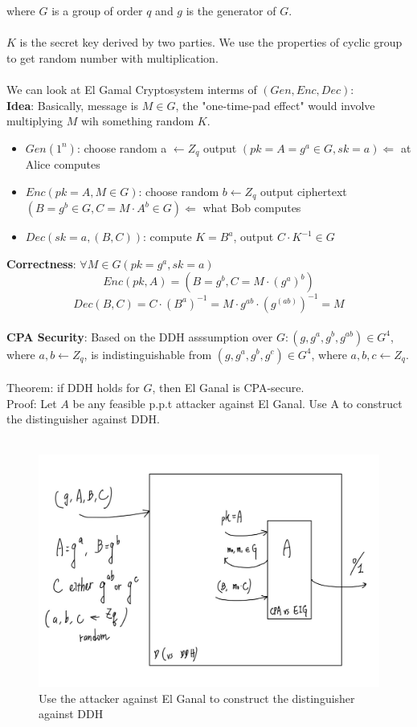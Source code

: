 \documentclass{scribe}
\begin{document}
where $G$ is a group of order $q$ and $g$ is the generator of $G$.
\\\\
$K$  is the secret key derived by two parties. We use the properties of cyclic group to get random number with multiplication.
\\\\
We can look at El Gamal Cryptosystem interms of $(Gen, Enc, Dec):$
\\
\textbf{Idea}: Basically, message is $M \in G$, the "one-time-pad effect" would involve multiplying $M$ wih something random $K$. 
\begin{itemize} 
    \item $Gen(1^n)$: choose random a $\leftarrow Z_q $ output $(pk=A=g^a \in G, sk=a) \Leftarrow$ at Alice computes\\
    \item $Enc(pk=A,M \in G)$: choose random $b \leftarrow Z_q$ output ciphertext $(B = g^b \in G, C = M \cdot A^b \in G) \Leftarrow $ what Bob computes
    \item $Dec(sk=a,(B,C))$: compute $K=B^a$, output $C \cdot K^{-1} \in G$
\end{itemize}
\textbf{Correctness}: $\forall M \in G$\text{, }$(pk=g^a,sk=a)$
\[Enc(pk,A) = (B = g^b, C = M \cdot (g^a)^b)\]
\[Dec(B,C) = C \cdot (B^a)^{-1} = M \cdot g^{ab} \cdot (g^{(ab)})^{-1} = M\]
\vspace{5mm}
\\
\noindent\textbf{CPA Security}: Based on the DDH asssumption over $G: (g,g^a,g^b,g^{ab}) \in G^4$, where $a,b \leftarrow Z_q$, is indistinguishable from $(g,g^a,g^b,g^{c}) \in G^4$, where $a,b,c \leftarrow Z_q$.
\\\\
Theorem: if DDH holds for $G$, then El Ganal is CPA-secure.
\\
Proof: Let $A$ be any feasible p.p.t attacker against El Ganal. Use A to construct the distinguisher against DDH.
\\\\
\begin{figure}[H]
    \centering
    \includegraphics[scale=0.2]{elg.jpg}
    \caption{Use the attacker against El Ganal to construct the distinguisher against DDH}
\end{figure}
\end{document}
